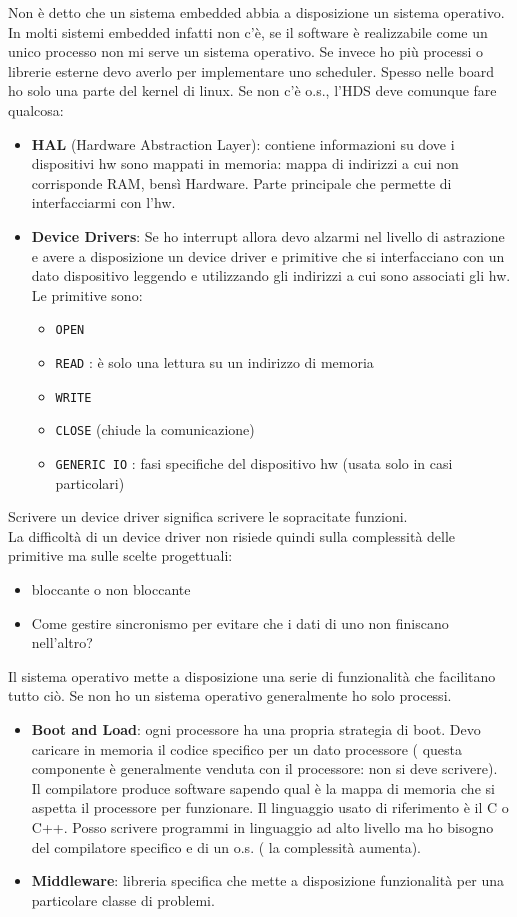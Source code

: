 \documentclass[a4paper]{article}
\theoremstyle{definition}
\begin{document}
			Non è detto che un sistema embedded abbia a disposizione un sistema operativo. In molti sistemi embedded infatti non c'è, se il software è realizzabile come un unico processo non mi serve un sistema operativo. Se invece ho più processi o librerie esterne devo averlo per implementare uno scheduler. Spesso nelle board ho solo una parte del kernel di linux. Se non c'è o.s., l'HDS deve comunque fare qualcosa:
			\begin{itemize}
				\item \textbf{HAL} (Hardware Abstraction Layer): contiene informazioni su dove i dispositivi hw sono mappati in memoria: mappa di indirizzi a cui non corrisponde RAM, bensì Hardware. Parte principale che permette di interfacciarmi con l'hw.
				\item \textbf{Device Drivers}: Se ho interrupt allora devo alzarmi nel livello di astrazione e avere a disposizione un device driver e primitive che si interfacciano con un dato dispositivo leggendo e utilizzando gli indirizzi a cui sono associati gli hw.
				Le primitive sono:
				\begin{itemize}
					\item \lstinline|OPEN|
					\item \lstinline|READ| : è solo una lettura su un indirizzo di memoria
					\item \lstinline|WRITE|
					\item \lstinline|CLOSE| (chiude la comunicazione)
					\item \lstinline|GENERIC IO| : fasi specifiche del dispositivo hw (usata solo in casi particolari)
				\end{itemize}
			\end{itemize}
			Scrivere un device driver significa scrivere le sopracitate funzioni.\\
			La difficoltà di un device driver non risiede quindi sulla complessità delle primitive ma sulle scelte progettuali:
			\begin{itemize}
				\item bloccante o non bloccante
				\item Come gestire sincronismo per evitare che i dati di uno non finiscano nell'altro?
			\end{itemize}
			Il sistema operativo mette a disposizione una serie di funzionalità che facilitano tutto ciò. Se non ho un sistema operativo generalmente ho solo processi. 
			\begin{itemize}
				\item \textbf{Boot and Load}: ogni processore ha una propria strategia di boot. Devo caricare in memoria il codice specifico per un dato processore ( questa componente è generalmente venduta con il processore: non si deve scrivere).\\
				Il compilatore produce software sapendo qual è la mappa di memoria che si aspetta il processore per funzionare.
				Il linguaggio usato di riferimento è il C o C++. Posso scrivere programmi in linguaggio ad alto livello ma ho bisogno del compilatore specifico e di un o.s. ( la complessità aumenta).
				\item \textbf{Middleware}: libreria specifica che mette a disposizione funzionalità per una particolare classe di problemi.
			\end{itemize}
\end{document}
